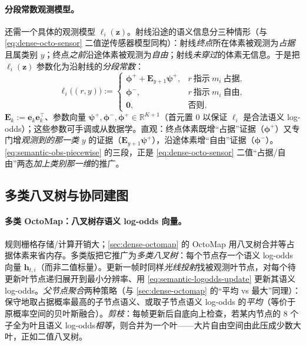 \paragraph{分段常数观测模型。}
还需一个具体的观测模型 $\boldsymbol\ell_i(\mathbf{z})$。射线沿途的语义信息分三种情形（与 \cref{eq:dense-octo-sensor} 二值逆传感器模型同构）：射线\emph{终点}所在体素被观测为\emph{占据}且属类别 $y$；终点\emph{之前}沿途体素被观测为\emph{自由}；射线\emph{未穿过}的体素无信息。于是把 $\boldsymbol\ell_i(\mathbf{z})$ 参数化为沿射线的\emph{分段常数}\cite{asgharivaskasi2023semantic}：
\begin{equation}
  \boldsymbol\ell_i\big((r,y)\big):=
  \begin{cases}
    \boldsymbol\phi^{+}+\mathbf{E}_{y+1}\boldsymbol\psi^{+}, & r\ \text{指示}\ m_i\ \text{占据},\\
    \boldsymbol\phi^{-}, & r\ \text{指示}\ m_i\ \text{自由},\\
    \mathbf{0}, & \text{否则},
  \end{cases}
  \label{eq:semantic-obs-piecewise}
\end{equation}
$\mathbf{E}_k:=\mathbf{e}_k\mathbf{e}_k^\top$、参数向量 $\boldsymbol\psi^{+},\boldsymbol\phi^{-},\boldsymbol\phi^{+}\in\mathbb{R}^{K+1}$（首元置 $0$ 以保证 $\boldsymbol\ell_i$ 是合法语义 log-odds）；这些参数可手调或从数据学\cite{asgharivaskasi2023semantic,gan2020bayesian}。直观：终点体素既增“占据”证据（$\boldsymbol\phi^{+}$）又专门增\emph{观测到的那一类} $y$ 的证据（$\mathbf{E}_{y+1}\boldsymbol\psi^{+}$），沿途体素增“自由”证据（$\boldsymbol\phi^{-}$）。\cref{eq:semantic-obs-piecewise} 的三段，正是 \cref{eq:dense-octo-sensor} 二值“占据/自由”两态\emph{加上类别那一维}的推广。

\subsection{多类八叉树与协同建图}
\label{sec:semantic-dense-octree}

\paragraph{多类 OctoMap：八叉树存语义 log-odds 向量。}
规则栅格存储/计算开销大；\cref{sec:dense-octomap} 的 OctoMap\cite{hornung2013octomap} 用八叉树合并等占据体素来省内存。多类版把它推广为\emph{多类八叉树}\cite{asgharivaskasi2023semantic}：每个节点存一个语义 log-odds 向量 $\mathbf{h}_{t,i}$（而非二值标量）。更新一帧时同样\emph{光线投射}找被观测叶节点，对每个待更新叶节点递归展开到最小分辨率、用 \cref{eq:semantic-logodds-update} 更新其语义 log-odds。\emph{父节点聚合}两种策略（与 \cref{sec:dense-octomap} 的“平均 vs 最大”同理）：保守地取占据概率最高的子节点语义、或取子节点语义 log-odds 的\emph{平均}（等价于原概率空间的贝叶斯融合）。\emph{剪枝}：每帧更新后自底向上检查，若某内节点的 $8$ 个子全为叶且语义 log-odds\emph{相等}，则合并为一个叶——大片自由空间由此压成少数大叶，正如二值八叉树。

